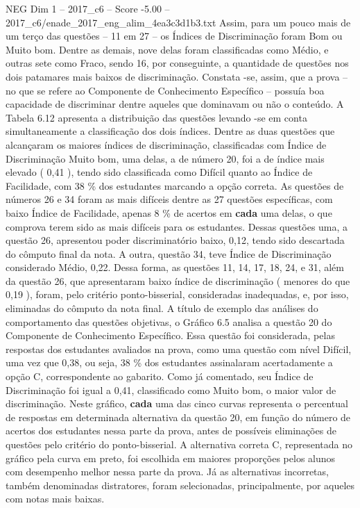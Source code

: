 \begin{textsample}{NEG Dim 1 – 2017\_c6 – Score -5.00 – 2017\_c6/enade\_2017\_eng\_alim\_4ea3c3d1b3.txt}
Assim, para um pouco mais de um terço das questões – 11 em 27 – os Índices de Discriminação foram Bom ou Muito bom.
Dentre as demais, nove delas foram classificadas como Médio, e outras sete como Fraco, sendo 16, por conseguinte, a quantidade de questões nos dois patamares mais baixos de discriminação.
Constata -se, assim, que a prova – no que se refere ao Componente de Conhecimento Específico – possuía boa capacidade de discriminar dentre aqueles que dominavam ou não o conteúdo.
A Tabela 6.12 apresenta a distribuição das questões levando -se em conta simultaneamente a classificação dos dois índices.
Dentre as duas questões que alcançaram os maiores índices de discriminação, classificadas com Índice de Discriminação Muito bom, uma delas, a de número 20, foi a de índice mais elevado ( 0,41 ), tendo sido classificada como Difícil quanto ao Índice de Facilidade, com 38 \% dos estudantes marcando a opção correta.
As questões de números 26 e 34 foram as mais difíceis dentre as 27 questões específicas, com baixo Índice de Facilidade, apenas 8 \% de acertos em \textbf{cada} uma delas, o que comprova terem sido as mais difíceis para os estudantes.
Dessas questões uma, a questão 26, apresentou poder discriminatório baixo, 0,12, tendo sido descartada do cômputo final da nota.
A outra, questão 34, teve Índice de Discriminação considerado Médio, 0,22.
Dessa forma, as questões 11, 14, 17, 18, 24, e 31, além da questão 26, que apresentaram baixo índice de discriminação ( menores do que 0,19 ), foram, pelo critério ponto-bisserial, consideradas inadequadas, e, por isso, eliminadas do cômputo da nota final.
A título de exemplo das análises do comportamento das questões objetivas, o Gráfico 6.5 analisa a questão 20 do Componente de Conhecimento Específico.
Essa questão foi considerada, pelas respostas dos estudantes avaliados na prova, como uma questão com nível Difícil, uma vez que 0,38, ou seja, 38 \% dos estudantes assinalaram acertadamente a opção C, correspondente ao gabarito.
Como já comentado, seu Índice de Discriminação foi igual a 0,41, classificado como Muito bom, o maior valor de discriminação.
Neste gráfico, \textbf{cada} uma das cinco curvas representa o percentual de respostas em determinada alternativa da questão 20, em função do número de acertos dos estudantes nessa parte da prova, antes de possíveis eliminações de questões pelo critério do ponto-bisserial.
A alternativa correta C, representada no gráfico pela curva em preto, foi escolhida em maiores proporções pelos alunos com desempenho melhor nessa parte da prova.
Já as alternativas incorretas, também denominadas distratores, foram selecionadas, principalmente, por aqueles com notas mais baixas.

\end{textsample}
